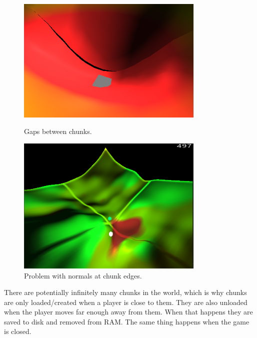 \begin{figure}[!htb]
    \centering
    \begin{minipage}{0.45\textwidth}
        \centering
        \includegraphics[width=0.8\textwidth]{chapters/implementation/sections/terrain/resources/chunk_edges_gaps.png}
        \caption{Gaps between chunks.}
        \label{fig:gaps_between_chunks}
    \end{minipage}\hfill
    \begin{minipage}{0.45\textwidth}
        \centering
        \includegraphics[width=0.8\textwidth]{chapters/implementation/sections/terrain/resources/chunk_edges_normals_problem.png}
        \caption{Problem with normals at chunk edges.}
        \label{fig:problem_with_normals_at_chunk_edge}
    \end{minipage}
\end{figure}

There are potentially infinitely many chunks in the world, which is why chunks are only loaded/created when a player is close to them.
They are also unloaded when the player moves far enough away from them.
When that happens they are saved to disk and removed from RAM.
The same thing happens when the game is closed.